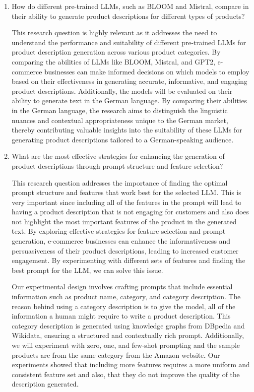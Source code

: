 \begin{enumerate}
    \item How do different pre-trained LLMs, such as BLOOM and Mistral, compare in their ability to generate product descriptions for different types of products?
    
    This research question is highly relevant as it addresses the need to understand the performance and suitability of different pre-trained LLMs for product description generation across various product categories. By comparing the abilities of LLMs like BLOOM, Mistral, and GPT2, e-commerce businesses can make informed decisions on which models to employ based on their effectiveness in generating accurate, informative, and engaging product descriptions. Additionally, the models will be evaluated on their ability to generate text in the German language. By comparing their abilities in the German language, the research aims to distinguish the linguistic nuances and contextual appropriateness unique to the German market, thereby contributing valuable insights into the suitability of these LLMs for generating product descriptions tailored to a German-speaking audience.
    
    \item What are the most effective strategies for enhancing the generation of product descriptions through prompt structure and feature selection?
    

    This research question addresses the importance of finding the optimal prompt structure and features that work best for the selected LLM. This is very important since including all of the features in the prompt will lead to having a product description that is not engaging for customers and also does not highlight the most important features of the product in the generated text. By exploring effective strategies for feature selection and prompt generation, e-commerce businesses can enhance the informativeness and persuasiveness of their product descriptions, leading to increased customer engagement. By experimenting with different sets of features and finding the best prompt for the LLM, we can solve this issue.

    Our experimental design involves crafting prompts that include essential information such as product name, category, and category description. The reason behind using a category description is to give the model, all of the information a human might require to write a product description. This category description is generated using knowledge graphs from DBpedia and Wikidata, ensuring a structured and contextually rich prompt. Additionally, we will experiment with zero, one, and few-shot prompting and the sample products are from the same category from the Amazon website. Our experiments showed that including more features requires a more uniform and consistent feature set and also, that they do not improve the quality of the description generated.


\end{enumerate}
